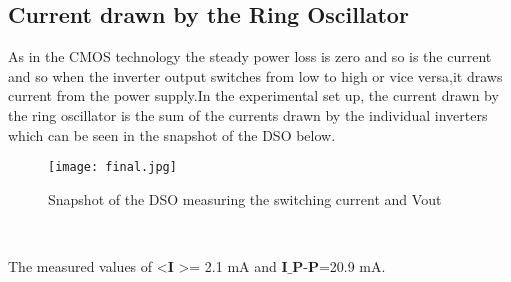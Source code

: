 \documentclass[12pt]{article}
\begin{document}
\subsection{Current drawn by the Ring Oscillator}
As in the CMOS technology the steady power loss is zero and so is the current and so when the inverter output switches from low to high or vice versa,it draws current from the power supply.In the experimental set up, the current drawn by the ring oscillator is the sum of the currents drawn by the individual inverters which can be seen in the snapshot of the DSO below.
\begin{figure}[H]
\texttt{[image: final.jpg]}
\centering
\caption{Snapshot of the DSO measuring the switching current and Vout}
\end{figure}
\\
\par The measured values of \textless \textbf{I} \textgreater = 2.1 mA and $\textbf{I_{P-P}}$=20.9 mA.
\end{document}
